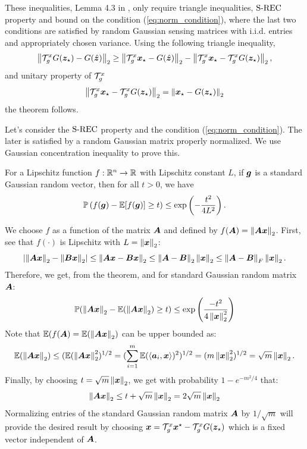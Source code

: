 These inequalities, Lemma 4.3 in \cite{Bora2017-as}, only require triangle inequalities, $\text{S-REC}$  property and bound on the condition (\ref{eq:norm_condition}), where the last two conditions are satisfied by random Gaussian sensing matrices with i.i.d. entries and appropriately chosen variance. Using the following triangle inequality,
\begin{equation}
    \left\|{\mathcal{T}}_g^x G({\bm{z}}_\star)- G(\hat{{\bm{z}}})\right\|_2\geq \left\|{\mathcal{T}}_g^x{\bm{x}}_\star- G(\hat{{\bm{z}}})\right\|_2 -\left\|{\mathcal{T}}_g^x{\bm{x}}_\star - {\mathcal{T}}_g^x G({\bm{z}}_\star)\right\|_2,
\end{equation}
and unitary property of ${\mathcal{T}}_g^x$
\begin{equation}
\left\|{\mathcal{T}}_g^x{\bm{x}}_\star-{\mathcal{T}}_g^x G({\bm{z}}_\star)\right\|_2  = \left\|{\bm{x}}_\star-  G({\bm{z}}_\star)\right\|_2
\end{equation}
the theorem follows. 


Let's consider the $\text{S-REC}$  property and the condition (\ref{eq:norm_condition}). The later is satisfied by a random Gaussian matrix properly normalized. We use Gaussian concentration inequality to prove this.

\begin{theorem}
For a Lipschitz function $f:\mathbb{R}^n\to\mathbb{R}$ with Lipschitz constant $L$, if ${\bm{g}}$ is a standard Gaussian random vector, then for all $t>0$, we have
\[
\mathbb{P}\left(f({\bm{g}})-\mathbb{E}[f({\bm{g}})]\geq t\right)\leq \exp\left(-\frac{t^2}{4L^2}\right).
\]
\end{theorem}
We choose $f$ as a function of the matrix ${\bm{A}}$ and defined by $f({\bm{A}})=\left\|{\bm{A}}{\bm{x}}\right\|_2$. First, see that $f(\cdot)$ is Lipschitz with $L=\left\|{\bm{x}}\right\|_2$:
\[
\left|\left\|{\bm{A}}{\bm{x}}\right\|_2 - \left\|{\bm{B}}{\bm{x}}\right\|_2 \right|\leq \left\|{\bm{A}}{\bm{x}}-{\bm{B}}{\bm{x}}\right\|_2\leq \left\|{\bm{A}}-{\bm{B}}\right\|_2 \left\|{\bm{x}}\right\|_2\leq    \left\|{\bm{A}}-{\bm{B}}\right\|_F \left\|{\bm{x}}\right\|_2.
\]
Therefore, we get, from the theorem, and for standard Gaussian random matrix ${\bm{A}}$:
\[
\mathbb{P}(\left\|{\bm{A}}{\bm{x}}\right\|_2-\mathbb{E}(\left\|{\bm{A}}{\bm{x}}\right\|_2)\geq t)\leq \exp{\left(\frac{-t^2}{4\left\|{\bm{x}}\right\|^2_2}\right)}
\]
Note that $\mathbb{E}(f({\bm{A}})=\mathbb{E}(\left\|{\bm{A}}{\bm{x}}\right\|_2)$ can be upper bounded as: 
\[
\mathbb{E}(\left\|{\bm{A}}{\bm{x}}\right\|_2)\leq (\mathbb{E}(\left\|{\bm{A}}{\bm{x}}\right\|^2_2)^{1/2}=  (\sum_{i=1}^m \mathbb{E}(\left\langle{\bm{a}}_i,{\bm{x}}\right\rangle)^2)^{1/2}  = (m\left\|{\bm{x}}\right\|^2_2)^{1/2}=\sqrt{m}\left\|{\bm{x}}\right\|_2.
\]
Finally, by choosing $t= \sqrt{m}\left\|{\bm{x}}\right\|_2$, we get with probability $1-e^{-m^2/4}$ that:
\[
\left\|{\bm{A}}{\bm{x}}\right\|_2\leq t + \sqrt{m}\left\|{\bm{x}}\right\|_2 = 2 \sqrt{m}\left\|{\bm{x}}\right\|_2 
\]
Normalizing entries of the standard Gaussian random matrix ${\bm{A}}$ by $1/\sqrt{m}$ will provide the desired result by choosing ${\bm{x}} = {\mathcal{T}}_g^x {\bm{x}}^\star-{\mathcal{T}}_g^x G({\bm{z}}_\star)$ which is a fixed vector independent of ${\bm{A}}$.

